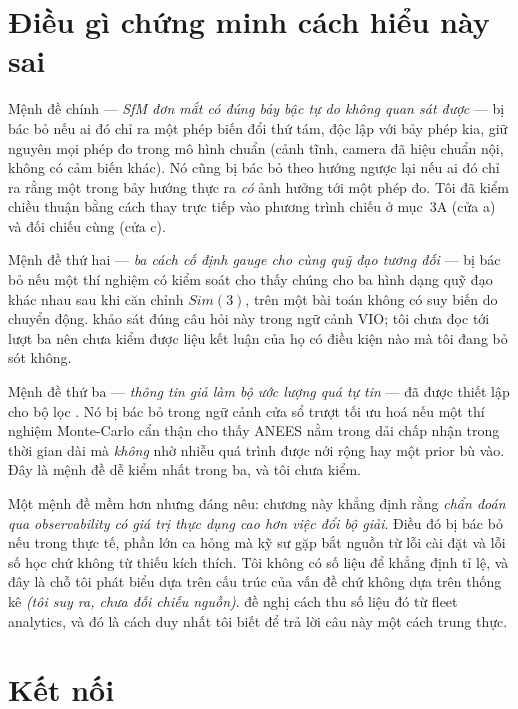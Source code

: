 \documentclass[../../vslam.tex]{subfiles}
\begin{document}
\section{Điều gì chứng minh cách hiểu này sai}

Mệnh đề chính --- \emph{SfM đơn mắt có đúng bảy bậc tự do không quan sát được} --- bị bác bỏ nếu ai đó chỉ ra một phép biến đổi thứ tám, độc lập với bảy phép kia, giữ nguyên mọi phép đo trong mô hình chuẩn (cảnh tĩnh, camera đã hiệu chuẩn nội, không có cảm biến khác). Nó cũng bị bác bỏ theo hướng ngược lại nếu ai đó chỉ ra rằng một trong bảy hướng thực ra \emph{có} ảnh hưởng tới một phép đo. Tôi đã kiểm chiều thuận bằng cách thay trực tiếp vào phương trình chiếu ở mục~3A (cửa a) và đối chiếu \cite{triggs2000ba} cùng \cite{hartley2004} (cửa c).

Mệnh đề thứ hai --- \emph{ba cách cố định gauge cho cùng quỹ đạo tương đối} --- bị bác bỏ nếu một thí nghiệm có kiểm soát cho thấy chúng cho ba hình dạng quỹ đạo khác nhau sau khi căn chỉnh \(Sim(3)\), trên một bài toán không có suy biến do chuyển động. \cite{zhang2018gaugeba} khảo sát đúng câu hỏi này trong ngữ cảnh VIO; tôi chưa đọc tới lượt ba nên chưa kiểm được liệu kết luận của họ có điều kiện nào mà tôi đang bỏ sót không.

Mệnh đề thứ ba --- \emph{thông tin giả làm bộ ước lượng quá tự tin} --- đã được thiết lập cho bộ lọc \cite{huang2008fej,hesch2014consistency}. Nó bị bác bỏ trong ngữ cảnh cửa sổ trượt tối ưu hoá nếu một thí nghiệm Monte-Carlo cẩn thận cho thấy ANEES nằm trong dải chấp nhận trong thời gian dài mà \emph{không} nhờ nhiễu quá trình được nới rộng hay một prior bù vào. Đây là mệnh đề dễ kiểm nhất trong ba, và tôi chưa kiểm.

Một mệnh đề mềm hơn nhưng đáng nêu: chương này khẳng định rằng \emph{chẩn đoán qua observability có giá trị thực dụng cao hơn việc đổi bộ giải}. Điều đó bị bác bỏ nếu trong thực tế, phần lớn ca hỏng mà kỹ sư gặp bắt nguồn từ lỗi cài đặt và lỗi số học chứ không từ thiếu kích thích. Tôi không có số liệu để khẳng định tỉ lệ, và đây là chỗ tôi phát biểu dựa trên cấu trúc của vấn đề chứ không dựa trên thống kê \emph{(tôi suy ra, chưa đối chiếu nguồn)}.  đề nghị cách thu số liệu đó từ fleet analytics, và đó là cách duy nhất tôi biết để trả lời câu này một cách trung thực.

\section{Kết nối}
\end{document}

